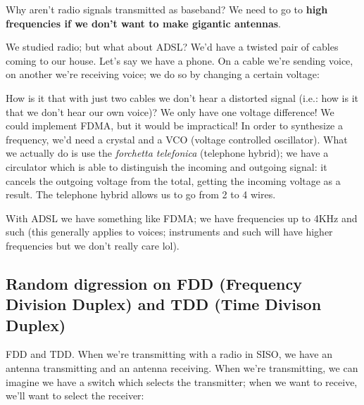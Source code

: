 \documentclass[a4paper, 12pt]{book}
\begin{document}
Why aren't radio signals transmitted as baseband? We need to go to \textbf{high frequencies if we don't want to make gigantic antennas}.

We studied radio; but what about ADSL? We'd have a twisted pair of cables coming to our house.
Let's say we have a phone. On a cable we're sending voice, on another we're receiving voice; we do so by changing a certain voltage:

\begin{center}
\end{center}

How is it that with just two cables we don't hear a distorted signal (i.e.: how is it that we don't hear our own voice)? We only have one voltage difference!
We could implement FDMA, but it would be impractical! In order to synthesize a frequency, we'd need a crystal and a VCO (voltage controlled oscillator).
What we actually do is use the \textit{forchetta telefonica} (telephone hybrid); we have a circulator which is able to distinguish the incoming and outgoing signal: it cancels the outgoing voltage from the total, getting the incoming voltage as a result.
The telephone hybrid allows us to go from 2 to 4 wires.

\clearpage %

With ADSL we have something like FDMA; we have frequencies up to 4KHz and such (this generally applies to voices; instruments and such will have higher frequencies but we don't really care lol).

\subsection{Random digression on FDD (Frequency Division Duplex) and TDD (Time Divison Duplex)}

FDD and TDD.
When we're transmitting with a radio in SISO, we have an antenna transmitting and an antenna receiving.
When we're transmitting, we can imagine we have a switch which selects the transmitter; when we want to receive, we'll want to select the receiver:
\end{document}
